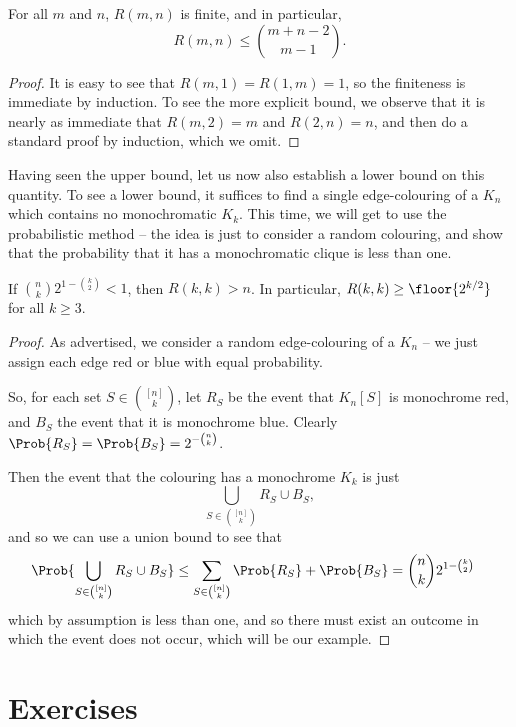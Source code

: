 \documentclass[nobib]{tufte-handout}
\begin{document}
\begin{corollary}
  For all $m$ and $n$, $R(m,n)$ is finite, and in particular,
  $$R(m,n) \leq \binom{m + n - 2}{m - 1}.$$

  \begin{proof}
    It is easy to see that $R(m,1) = R(1,m) = 1$, so the finiteness is immediate by induction. To see the more explicit bound, we observe that it is nearly as immediate that $R(m,2) = m$ and $R(2,n) = n$, and then do a standard proof by induction, which we omit.
  \end{proof}
\end{corollary}

Having seen the upper bound, let us now also establish a lower bound on this quantity. To see a lower bound, it suffices to find a single edge-colouring of a $K_n$ which contains no monochromatic $K_k$. This time, we will get to use the probabilistic method -- the idea is just to consider a random colouring, and show that the probability that it has a monochromatic clique is less than one.

\begin{theorem}[Erd\H{o}s, 1947]
  If $\binom{n}{k}2^{1 - \binom{k}{2}} < 1$, then $R(k,k) > n$. In particular, $R(k,k) \geq \floor{2^{k/2}}$ for all $k \geq 3$.

  \begin{proof}
    As advertised, we consider a random edge-colouring of a $K_n$ -- we just assign each edge red or blue with equal probability.

    So, for each set $S \in \binom{[n]}{k}$, let $R_S$ be the event that $K_n[S]$ is monochrome red, and $B_S$ the event that it is monochrome blue. Clearly $\Prob{R_S} = \Prob{B_S} = 2^{-\binom{n}{k}}$.
    
    Then the event that the colouring has a monochrome $K_k$ is just
    $$\bigcup_{S \in \binom{[n]}{k}} R_S \cup B_S,$$
    and so we can use a union bound to see that
    \begin{align*}
      \Prob{\bigcup_{S \in \binom{[n]}{k}} R_S \cup B_S} &\leq \sum_{S \in \binom{[n]}{k}} \Prob{R_S} + \Prob{B_S} = \binom{n}{k}2^{1 - \binom{k}{2}}
    \end{align*}
    which by assumption is less than one, and so there must exist an outcome in which the event does not occur, which will be our example.
  \end{proof}
\end{theorem}

\section{Exercises}


%
%
\end{document}
